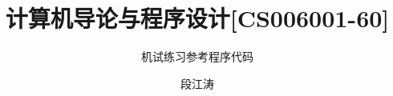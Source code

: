 \documentclass[graybox,envcountchap,sectrefs]{svmono}
\begin{document}
\author{段江涛}
\title{ 计算机导论与程序设计[CS006001-60]}
\subtitle{机试练习参考程序代码 }



\date{\zhtoday}

\maketitle  %



\tableofcontents   %



\end{document}
